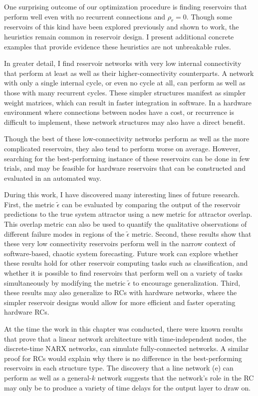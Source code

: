 One surprising outcome of our optimization procedure is finding
reservoirs that perform well even with no recurrent connections and
$\rho_r=0$.  Though some reservoirs of this kind have been explored
previously and shown to work,\cite{pathak2017,rodan2011} the
heuristics remain common in reservoir design. I present additional
concrete examples that provide evidence these heuristics are not
unbreakable rules.

In greater detail, I find reservoir networks with very low internal
connectivity that perform at least as well as their
higher-connectivity counterparts. A network with only a single
internal cycle, or even no cycle at all, can perform as well as those
with many recurrent cycles. These simpler structures manifest as
simpler weight matrices, which can result in faster integration in
software. In a hardware environment where connections between nodes
have a cost, or recurrence is difficult to implement, these network
structures may also have a direct benefit.

Though the best of these low-connectivity networks perform as well
as the more complicated reservoirs, they also tend to perform worse on
average. However, searching for the best-performing instance of these
reservoirs can be done in few trials, and may be feasible for hardware
reservoirs that can be constructed and evaluated in an automated way.

During this work, I have discovered many interesting lines of future
research. First, the metric $\tilde{\epsilon}$ can be evaluated by
comparing the output of the reservoir predictions to the true system
attractor using a new metric for attractor overlap.\cite{ishar2019}
This overlap metric can also be used to quantify the qualitative
observations of different failure modes in regions of the
$\tilde{\epsilon}$ metric. Second, these results show that these very
low connectivity reservoirs perform well in the narrow context of
software-based, chaotic system forecasting. Future work can explore
whether these results hold for other reservoir computing tasks such as
classification, and whether it is possible to find reservoirs that
perform well on a variety of tasks simultaneously by modifying the
metric $\tilde{\epsilon}$ to encourage generalization. Third, these
results may also generalize to RCs with hardware networks, where the
simpler reservoir designs would allow for more efficient and faster
operating hardware RCs.

At the time the work in this chapter was conducted, there were known
results that prove that a linear network architecture with
time-independent nodes, the discrete-time NARX networks, can simulate
fully-connected networks.\cite{siegelmann1997} A similar proof for RCs
would explain why there is no difference in the best-performing
reservoirs in each structure type. The discovery that a line network
(e) can perform as well as a general-$k$ network suggests that the
network's role in the RC may only be to produce a variety of time
delays for the output layer to draw on.

